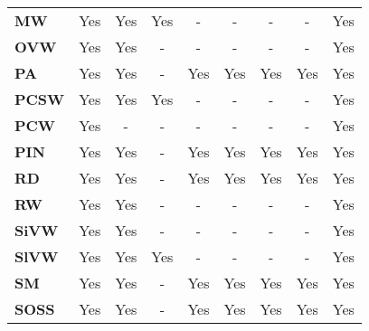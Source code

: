 \begin{table}[ht!]
\begin{tabular}{lcccccccc}
\textbf{MW}          & Yes             & Yes             & Yes                 & -              & -                    & -                     & -                     & Yes             \\
\textbf{OVW}         & Yes             & Yes             & -                   & -              & -                    & -                     & -                     & Yes             \\
\textbf{PA}          & Yes             & Yes             & -                   & Yes            & Yes                  & Yes                   & Yes                   & Yes             \\
\textbf{PCSW}        & Yes             & Yes             & Yes                 & -              & -                    & -                     & -                     & Yes             \\
\textbf{PCW}         & Yes             & -               & -                   & -              & -                    & -                     & -                     & Yes             \\
\textbf{PIN}         & Yes             & Yes             & -                   & Yes            & Yes                  & Yes                   & Yes                   & Yes             \\
\textbf{RD}          & Yes             & Yes             & -                   & Yes            & Yes                  & Yes                   & Yes                   & Yes             \\
\textbf{RW}          & Yes             & Yes             & -                   & -              & -                    & -                     & -                     & Yes             \\
\textbf{SiVW}        & Yes             & Yes             & -                   & -              & -                    & -                     & -                     & Yes             \\
\textbf{SlVW}        & Yes             & Yes             & Yes                 & -              & -                    & -                     & -                     & Yes             \\
\textbf{SM}          & Yes             & Yes             & -                   & Yes            & Yes                  & Yes                   & Yes                   & Yes             \\
\textbf{SOSS}        & Yes             & Yes             & -                   & Yes            & Yes                  & Yes                   & Yes                   & Yes             \\

\end{tabular}
\end{table}
